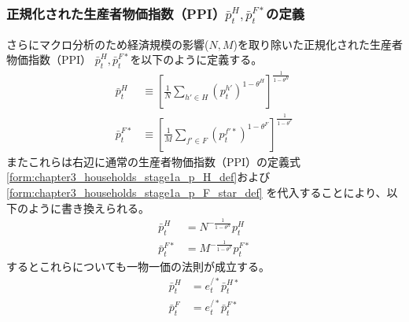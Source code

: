 \subsubsection{正規化された生産者物価指数（PPI）\(\bar{p}_t^H, \bar{p}_t^{F*}\)の定義}
\label{sec:chapter3_households_stage1a_normalized_ppi_definitions}
さらにマクロ分析のため経済規模の影響(\(N,M\))を取り除いた正規化された生産者物価指数（PPI）
\(\bar{p}_t^H, \bar{p}_t^{F*}\)を以下のように定義する。
\begin{align}
    \label{form:chapter3_households_stage1a_normalized_ppi_definitions_p_H_bar_def}
        \bar{p}_t^H&\equiv\left[\frac{1}{N}\sum_{h'\in H}(p_t^{h'})^{1-\theta^H}\right]^{\frac{1}{1-\theta^H}} \\
    \label{form:chapter3_households_stage1a_normalized_ppi_definitions_p_F_star_bar_def}   
        \bar{p}_t^{F*}&\equiv\left[\frac{1}{M}\sum_{f'\in F}(p_t^{f'*})^{1-\theta^F}\right]^{\frac{1}{1-\theta^F}}
\end{align}
またこれらは右辺に通常の生産者物価指数（PPI）の定義式
\eqref{form:chapter3_households_stage1a_p_H_def}および
\eqref{form:chapter3_households_stage1a_p_F_star_def}
を代入することにより、以下のように書き換えられる。
\begin{align}
    \label{form:chapter3_households_stage1a_normalized_ppi_definitions_p_H_bar_eq}
        \bar{p}_t^H&=N^{-\frac{1}{1-\theta^H}}p_t^H \\
    \label{form:chapter3_households_stage1a_normalized_ppi_definitions_p_F_star_bar_eq}   
        \bar{p}_t^{F*}&=M^{-\frac{1}{1-\theta^F}}p_t^{F*}
\end{align}
するとこれらについても一物一価の法則が成立する。
\begin{align}
    \label{form:chapter3_households_stage1a_normalized_ppi_definitions_p_H_bar_lop_eq}
        \bar{p}_t^H&=e_t^{/*}\bar{p}_t^{H*}\\
    \label{form:chapter3_households_stage1a_normalized_ppi_definitions_p_F_bar_lop_ea}
        \bar{p}_t^F&=e_t^{/*}\bar{p}_t^{F*}
\end{align}

